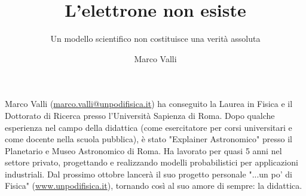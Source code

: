 ﻿\title{L'elettrone non esiste}
\subtitle{Un modello scientifico non costituisce una verità assoluta}
\suptitle{\phantom{x}}
\author{Marco Valli}
\maketitle
\begin{small}
\pichskip{4mm}
\nobalance



\vfill
\begin{thebiography}{}%
Marco Valli (\url{marco.valli@unpodifisica.it}) ha conseguito la Laurea in Fisica e il Dottorato di Ricerca presso l'Università Sapienza di Roma. Dopo qualche esperienza nel campo della didattica (come esercitatore per corsi universitari e come docente nella scuola pubblica), è stato "Explainer Astronomico" presso il Planetario e Museo Astronomico di Roma. Ha lavorato per quasi 5 anni nel settore privato, progettando e realizzando modelli probabilistici per applicazioni industriali. Dal prossimo ottobre lancerà il suo progetto personale "...un po' di Fisica" (\url{www.unpodifisica.it}), tornando così al suo amore di sempre: la didattica.
\end{thebiography}
\end{small}

